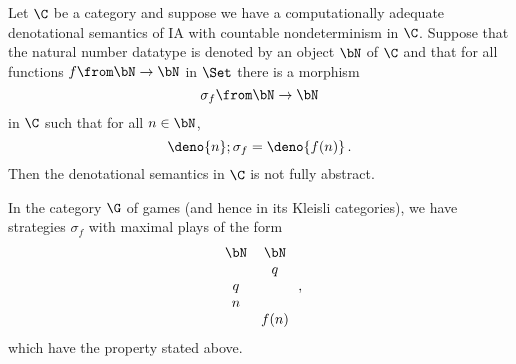 \begin{proposition}
  Let $\C$ be a category and suppose we have a computationally adequate denotational semantics of IA with countable nondeterminism in $\C$.
  Suppose that the natural number datatype is denoted by an object $\bN$ of $\C$ and that for all functions $f \from \bN \to \bN$ in $\Set$ there is a morphism
  \[
    \sigma_f \from \bN \to \bN
    \]
  in $\C$ such that for all $n\in \bN$, 
  \[
    \deno{n};\sigma_f = \deno{f(n)}\,.
    \]
  Then the denotational semantics in $\C$ is not fully abstract.
  \label{PropNotFullyAbstract}
\end{proposition}
\begin{example}
  In the category $\G$ of games (and hence in its Kleisli categories), we have strategies $\sigma_f$ with maximal plays of the form
  \[
    \begin{array}{cc}
      \bN & \bN \\
          &  q  \\
       q  &     \\
       n  &     \\
          & f(n)
    \end{array}\,,
    \]
  which have the property stated above.
\end{example}
